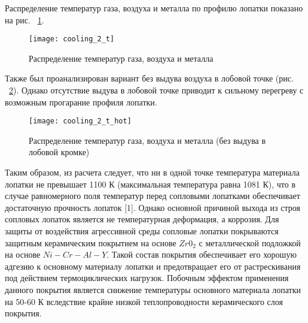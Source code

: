 Распределение температур газа, воздуха и металла по профилю лопатки показано на рис. ~\ref{img:cool_gas_parameters_front}.
\begin{figure}[H]
    \centering
	\texttt{[image: cooling\_2\_t]}
	\caption{Распределение температур газа, воздуха и металла}
	\label{img:cool_gas_parameters_front}
\end{figure}

Также был проанализирован вариант без выдува воздуха в лобовой точке (рис. ~\ref{img:cool_gas_parameters_no_front}).
Однако отсутствие выдува в лобовой точке приводит к сильному перегреву с возможным прогарание профиля лопатки.
\begin{figure}[H]
    \centering
	\texttt{[image: cooling\_2\_t\_hot]}
	\caption{Распределение температур газа, воздуха и металла (без выдува в лобовой кромке)}
	\label{img:cool_gas_parameters_no_front}
\end{figure}

Таким образом, из расчета следует, что ни в одной точке температура материала лопатки не превышает 1100 К (максимальная температура
равна 1081 К), что в случае равномерного поля температур перед сопловыми лопатками обеспечивает достаточную прочность лопаток [1].
Однако основной причиной выхода из строя сопловых лопаток является не температурная деформация, а коррозия.
Для защиты от воздействия агрессивной среды сопловые лопатки покрываются защитным керамическим покрытием на основе
$Zr0_2$ с металлической подложкой на основе $Ni-Cr-Al-Y$. Такой состав покрытия обеспечивает его хорошую адгезию к
основному материалу лопатки и предотвращает его от растрескивания под действием термоциклических нагрузок.
Побочным эффектом применения данного покрытия является снижение температуры основного материала лопатки на 50-60 К
вследствие крайне низкой теплопроводности керамического слоя покрытия.
